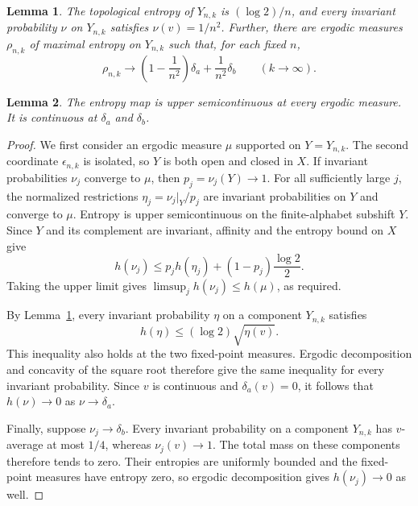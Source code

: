 \documentclass[10pt,a4paper]{amsart}
\newtheorem{lemma}{Lemma}
\begin{document}
\begin{lemma}\label{lem:components}
The topological entropy of $Y_{n,k}$ is $(\log2)/n$, and every
invariant probability $\nu$ on $Y_{n,k}$ satisfies $\nu(v)=1/n^2$.
Further, there are ergodic measures $\rho_{n,k}$ of maximal entropy on
$Y_{n,k}$ such that, for each fixed $n$,
\begin{equation}\label{eq:component-limit}
 \rho_{n,k}\longrightarrow
 \left(1-\frac{1}{n^2}\right)\delta_a+\frac{1}{n^2}\delta_b
 \qquad(k\to\infty).
\end{equation}
\end{lemma}

\begin{lemma}\label{lem:example-continuity}
The entropy map is upper semicontinuous at every ergodic measure.
It is continuous at $\delta_a$ and $\delta_b$.
\end{lemma}

\begin{proof}
We first consider an ergodic measure $\mu$ supported on
$Y=Y_{n,k}$. The second coordinate $\epsilon_{n,k}$ is isolated,
so $Y$ is both open and closed in $X$. If invariant probabilities
$\nu_j$ converge to $\mu$, then $p_j=\nu_j(Y)\to1$. For all
sufficiently large $j$, the normalized restrictions
$\eta_j=\nu_j|_Y/p_j$ are invariant probabilities on $Y$ and converge
to $\mu$. Entropy is upper semicontinuous on the finite-alphabet
subshift $Y$. Since $Y$ and its complement are invariant, affinity
and the entropy bound on $X$ give
\[
 h(\nu_j)\leq p_j h(\eta_j)+(1-p_j)\frac{\log2}{2}.
\]
Taking the upper limit gives $\limsup_j h(\nu_j)\leq h(\mu)$, as
required.

By Lemma~\ref{lem:components}, every invariant probability $\eta$
on a component $Y_{n,k}$ satisfies
\[
 h(\eta)\leq(\log2)\sqrt{\eta(v)}.
\]
This inequality also holds at the two fixed-point measures.
Ergodic decomposition and concavity of the square root therefore
give the same inequality for every invariant probability.
Since $v$ is continuous and $\delta_a(v)=0$, it follows that
$h(\nu)\to0$ as $\nu\to\delta_a$.

Finally, suppose $\nu_j\to\delta_b$. Every invariant probability
on a component $Y_{n,k}$ has $v$-average at most $1/4$, whereas
$\nu_j(v)\to1$. The total mass on these components therefore tends
to zero. Their entropies are uniformly bounded and the fixed-point
measures have entropy zero, so ergodic decomposition gives
$h(\nu_j)\to0$ as well.
\end{proof}
\end{document}

